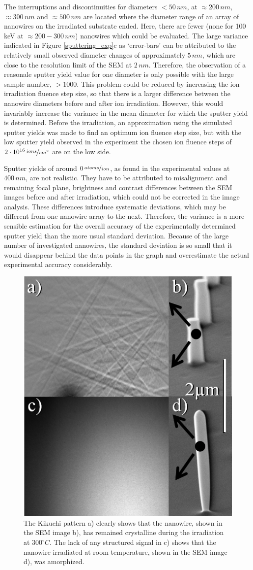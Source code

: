 The interruptions and discontinuities for diameters $<50\,nm$, at $\approx 200\,nm$, $\approx 300\,nm$ and $\approx 500\,nm$ are located where the diameter range of an array of nanowires on the irradiated substrate ended. Here, there are fewer (none for 100\,keV at $\approx 200 - 300\,nm$) nanowires which could be evaluated. The large variance indicated in Figure \ref{sputtering_exp}c as `error-bars' can be attributed to the relatively small observed diameter changes of approximately $5\,nm$, which are close to the resolution limit of the SEM at $2\,nm$. Therefore, the observation of a reasonale sputter yield value for one diameter is only possible with the large sample number, $>1000$. This problem could be reduced by increasing the ion irradiation fluence step size, so that there is a larger difference between the nanowire diameters before and after ion irradiation. However, this would invariably increase the variance in the mean diameter for which the sputter yield is determined. Before the irradiation, an approximation using the simulated sputter yields was made to find an optimum ion fluence step size, but with the low sputter yield observed in the experiment the chosen ion fluence steps of $2\cdot10^{16}\,\nicefrac{ions}{cm^2}$ are on the low side.

Sputter yields of around $0\,\nicefrac{atoms}{ion}$, as found in the experimental values at $400\,nm$, are not realistic. They have to be attributed to misalignment and remaining focal plane, brightness and contrast differences between the SEM images before and after irradiation, which could not be corrected in the image analysis. These differences introduce systematic deviations, which may be different from one nanowire array to the next. Therefore, the variance is a more sensible estimation for the overall accuracy of the experimentally determined sputter yield than the more usual standard deviation. Because of the large number of investigated nanowires, the standard deviation is so small that it would disappear behind the data points in the graph and overestimate the actual experimental accuracy considerably.

\begin{figure}
	\centering
		\includegraphics[width=.35\textwidth]{images/EBSD.jpg}
	\caption{The Kikuchi pattern a) clearly shows that the nanowire, shown in the SEM image b), has remained crystalline during the irradiation at $300^\circ C$. The lack of any structured signal in c) shows that the nanowire irradiated at room-temperature, shown in the SEM image d), was amorphized.} 
	\label{EBSD}
\end{figure}

